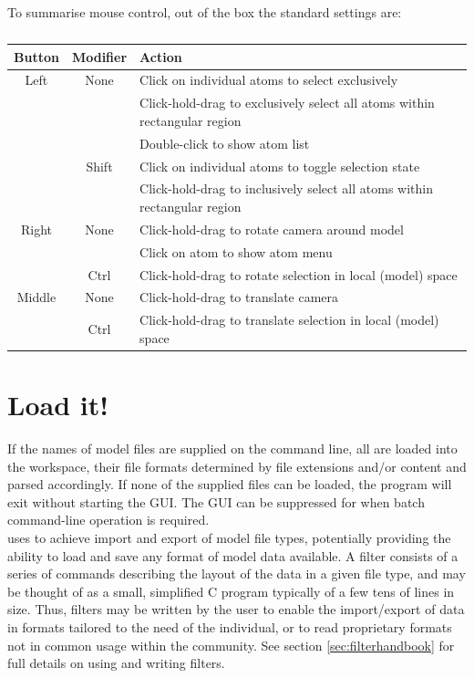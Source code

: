 To summarise mouse control, out of the box the standard settings are:\\

\begin{table}[h!]
  \caption{}
  \begin{tabular}{cc|l}
\hline
	Button	& Modifier	& Action \\
\hline
	Left	& None		& Click on individual atoms to select exclusively \\
		&		& Click-hold-drag to exclusively select all atoms within rectangular region \\
		&		& Double-click to show atom list \\
		& Shift		& Click on individual atoms to toggle selection state \\
		&		& Click-hold-drag to inclusively select all atoms within rectangular region \\
\hline
	Right	& None		& Click-hold-drag to rotate camera around model \\
		&		& Click on atom to show atom menu \\
		& Ctrl		& Click-hold-drag to rotate selection in local (model) space \\
\hline
	Middle	& None		& Click-hold-drag to translate camera \\
		& Ctrl		& Click-hold-drag to translate selection in local (model) space \\
  \end{tabular}
\end{table}


\section{Load it!}
\label{sec:loadit}
If the names of model files are supplied on the command line, all are loaded into the workspace, their file formats determined by file extensions and/or content and parsed accordingly. If none of the supplied files can be loaded, the program will exit without starting the GUI. The GUI can be suppressed for when batch command-line operation is required.\\

\progname{} uses  to achieve import and export of model file types, potentially providing the ability to load and save any format of model data available. A filter consists of a series of commands describing the layout of the data in a given file type, and may be thought of as a small, simplified C program typically of a few tens of lines in size. Thus, filters may be written by the user to enable the import/export of data in formats tailored to the need of the individual, or to read proprietary formats not in common usage within the community. See section \ref{sec:filterhandbook} for full details on using and writing filters. \\


